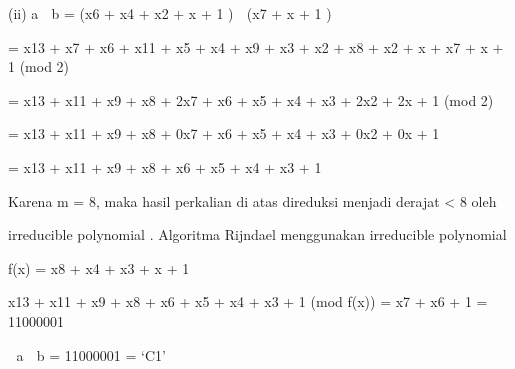 \documentclass{article}
\begin{document}

(ii) a  b = (x6 + x4 + x2 + x + 1 )  (x7 + x + 1 )  

                 = x13 + x7 + x6 + x11 + x5 + x4 + x9 + x3 + x2 + x8 + x2 + x + x7 + x + 1 (mod 2)


    = x13 + x11 + x9 + x8 + 2x7 + x6 + x5 + x4 + x3 + 2x2 + 2x + 1 (mod 2) 


    = x13 + x11 + x9 + x8 + 0x7 + x6 + x5 + x4 + x3 + 0x2 + 0x + 1 

                = x13 + x11 + x9 + x8 + x6 + x5 + x4 + x3 + 1  


   Karena m = 8, maka hasil perkalian di atas direduksi menjadi derajat < 8 oleh 

 irreducible polynomial . Algoritma Rijndael menggunakan irreducible polynomial

   f(x) = x8 +  x4 +  x3 + x + 1 

  x13 + x11 + x9 + x8 + x6 + x5 + x4 + x3 + 1 (mod f(x)) = x7 + x6 + 1  = 11000001




  a  b = 11000001 = ‘C1’
\end{document}

